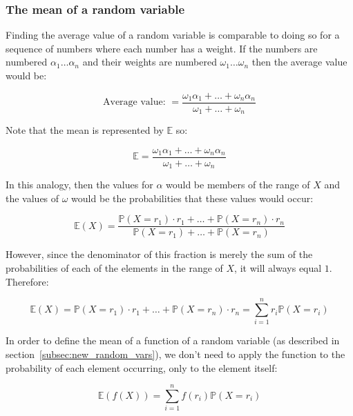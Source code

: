\subsubsection{The mean of a random variable}

Finding the average value of a random variable is comparable to doing so for a
sequence of numbers where each number has a weight. If the numbers are numbered
$\alpha_1 \dots \alpha_n$ and their weights are numbered $\omega_1 \dots
\omega_n$ then the average value would be:

\begin{dmath*}
	\textrm{Average value: } = \frac{\omega_1\alpha_1 + \dots + \omega_n\alpha_n}{\omega_1 + \dots + \omega_n}
\end{dmath*}

Note that the mean is represented by $\mathbb{E}$ so:

\begin{dmath*}
	\mathbb{E} = \frac{\omega_1\alpha_1 + \dots + \omega_n\alpha_n}{\omega_1 + \dots + \omega_n}
\end{dmath*}

In this analogy, then the values for $\alpha$ would be members of the range of
$X$ and the values of $\omega$ would be the probabilities that these values
would occur:

\begin{dmath*}
	\mathbb{E}(X) = \frac{\mathbb{P}(X = r_1) \cdot r_1 + \dots + \mathbb{P}(X = r_n) \cdot r_n}{\mathbb{P}(X = r_1) + \dots + \mathbb{P}(X = r_n)}
\end{dmath*}

However, since the denominator of this fraction is merely the sum of the
probabilities of each of the elements in the range of $X$, it will always equal
$1$. Therefore:

\begin{dmath*}
	\mathbb{E}(X) = {\mathbb{P}(X = r_1) \cdot r_1 + \dots + \mathbb{P}(X = r_n) \cdot r_n} = {\sum\limits_{i=1}^{n} r_i \mathbb{P}(X = r_i)}
\end{dmath*}

In order to define the mean of a function of a random variable (as described in
section~\ref{subsec:new_random_vars}), we don't need to apply the function to
the probability of each element occurring, only to the element itself:

\begin{dmath*}
	\mathbb{E}(f(X)) = {\sum\limits_{i=1}^{n} f(r_i) \mathbb{P}(X = r_i)}
\end{dmath*}

